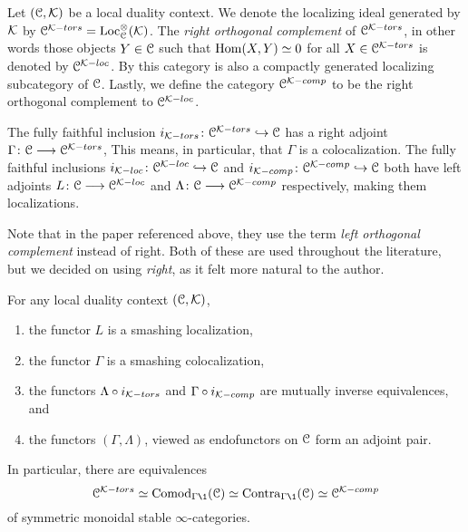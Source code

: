 \begin{construction}
    Let $(\EuScript{C}, \mathcal{K})$ be a local duality context. We denote the localizing ideal generated by $\mathcal{K}$ by $\EuScript{C}^{\mathcal{K}-tors} = \operatorname{Loc}_{\EuScript{C}}^\otimes(\mathcal{K})$. The \emph{right orthogonal complement} of $\EuScript{C}^{\mathcal{K}-tors}$, in other words those objects $Y\in \EuScript{C}$ such that $\operatorname{Hom}(X, Y) \simeq 0$ for all $X\in \EuScript{C}^{\mathcal{K}-tors}$ is denoted by $\EuScript{C}^{\mathcal{K}-loc}$. By \cite[2.17]{barthel-heard-valenzuela_2018} this category is also a compactly generated localizing subcategory of $\EuScript{C}$. Lastly, we define the category $\EuScript{C}^{\mathcal{K}-comp}$ to be the right orthogonal complement to $\EuScript{C}^{\mathcal{K}-loc}$. 

    The fully faithful inclusion $i_{\mathcal{K}-tors}\colon\EuScript{C}^{\mathcal{K}-tors}\hookrightarrow \EuScript{C}$ has a right adjoint $\Gamma \colon\EuScript{C}\longrightarrow \EuScript{C}^{\mathcal{K}-tors}$, This means, in particular, that $\Gamma$ is a colocalization. The fully faithful inclusions $i_{\mathcal{K}-loc}\colon\EuScript{C}^{\mathcal{K}-loc}\hookrightarrow \EuScript{C}$ and $i_{\mathcal{K}-comp}\colon\EuScript{C}^{\mathcal{K}-comp}\hookrightarrow \EuScript{C}$ both have left adjoints $L\colon \EuScript{C}\longrightarrow \EuScript{C}^{\mathcal{K}-loc}$ and $\Lambda\colon\EuScript{C}\longrightarrow \EuScript{C}^{\mathcal{K}-comp}$ respectively, making them localizations. 
\end{construction}

\begin{remark}
    Note that in the paper \cite{barthel-heard-valenzuela_2018} referenced above, they use the term \emph{left orthogonal complement} instead of right. Both of these are used throughout the literature, but we decided on using \emph{right}, as it felt more natural to the author. 
\end{remark}

\begin{theorem}
    \label{ch2:thm:local-duality-co-contra}
    For any local duality context $(\EuScript{C}, \mathcal{K})$, 
    \begin{enumerate}
        \item the functor $L$ is a smashing localization,
        \item the functor $\Gamma$ is a smashing colocalization,
        \item the functors $\Lambda\circ i_{\mathcal{K}-tors}$ and $\Gamma \circ i_{\mathcal{K}-comp}$ are mutually inverse equivalences, and 
        \item the functors $(\Gamma, \Lambda)$, viewed as endofunctors on $\EuScript{C}$ form an adjoint pair. 
    \end{enumerate} 
    In particular, there are equivalences
    \[\C^{\K-tors}\simeq \Comod_{\Gamma \1}(\C)\simeq \Contra_{\Gamma \1}(\C) \simeq \C^{\K-comp}\]
    of symmetric monoidal stable $\infty$-categories. 
\end{theorem}

